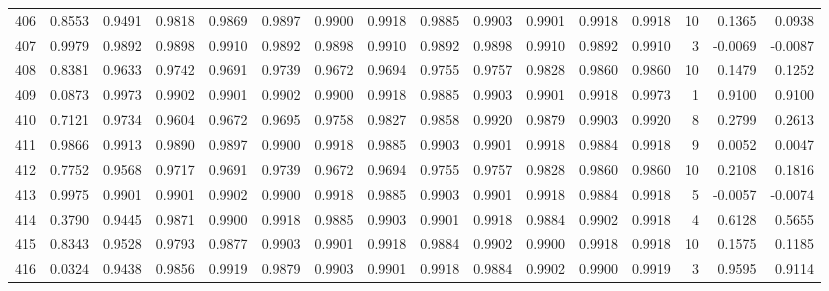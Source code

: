 \begin{tabular}{lrrrrrrrrrrrrrrr}
406 &      0.8553 &  0.9491 &  0.9818 &  0.9869 &  0.9897 &  0.9900 &  0.9918 &  0.9885 &  0.9903 &  0.9901 &   0.9918 &     0.9918 &     10 &                    0.1365 &                     0.0938 \\
407 &      0.9979 &  0.9892 &  0.9898 &  0.9910 &  0.9892 &  0.9898 &  0.9910 &  0.9892 &  0.9898 &  0.9910 &   0.9892 &     0.9910 &      3 &                   -0.0069 &                    -0.0087 \\
408 &      0.8381 &  0.9633 &  0.9742 &  0.9691 &  0.9739 &  0.9672 &  0.9694 &  0.9755 &  0.9757 &  0.9828 &   0.9860 &     0.9860 &     10 &                    0.1479 &                     0.1252 \\
409 &      0.0873 &  0.9973 &  0.9902 &  0.9901 &  0.9902 &  0.9900 &  0.9918 &  0.9885 &  0.9903 &  0.9901 &   0.9918 &     0.9973 &      1 &                    0.9100 &                     0.9100 \\
410 &      0.7121 &  0.9734 &  0.9604 &  0.9672 &  0.9695 &  0.9758 &  0.9827 &  0.9858 &  0.9920 &  0.9879 &   0.9903 &     0.9920 &      8 &                    0.2799 &                     0.2613 \\
411 &      0.9866 &  0.9913 &  0.9890 &  0.9897 &  0.9900 &  0.9918 &  0.9885 &  0.9903 &  0.9901 &  0.9918 &   0.9884 &     0.9918 &      9 &                    0.0052 &                     0.0047 \\
412 &      0.7752 &  0.9568 &  0.9717 &  0.9691 &  0.9739 &  0.9672 &  0.9694 &  0.9755 &  0.9757 &  0.9828 &   0.9860 &     0.9860 &     10 &                    0.2108 &                     0.1816 \\
413 &      0.9975 &  0.9901 &  0.9901 &  0.9902 &  0.9900 &  0.9918 &  0.9885 &  0.9903 &  0.9901 &  0.9918 &   0.9884 &     0.9918 &      5 &                   -0.0057 &                    -0.0074 \\
414 &      0.3790 &  0.9445 &  0.9871 &  0.9900 &  0.9918 &  0.9885 &  0.9903 &  0.9901 &  0.9918 &  0.9884 &   0.9902 &     0.9918 &      4 &                    0.6128 &                     0.5655 \\
415 &      0.8343 &  0.9528 &  0.9793 &  0.9877 &  0.9903 &  0.9901 &  0.9918 &  0.9884 &  0.9902 &  0.9900 &   0.9918 &     0.9918 &     10 &                    0.1575 &                     0.1185 \\
416 &      0.0324 &  0.9438 &  0.9856 &  0.9919 &  0.9879 &  0.9903 &  0.9901 &  0.9918 &  0.9884 &  0.9902 &   0.9900 &     0.9919 &      3 &                    0.9595 &                     0.9114 \\

\end{tabular}
